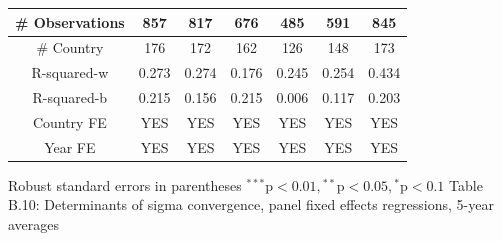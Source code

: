 \documentclass[10pt]{article}
\begin{document}
\begin{center}
\begin{tabular}{|c|c|c|c|c|c|c|}
\hline
\# Observations & 857 & 817 & 676 & 485 & 591 & 845 \\
\hline
\# Country & 176 & 172 & 162 & 126 & 148 & 173 \\
\hline
R-squared-w & 0.273 & 0.274 & 0.176 & 0.245 & 0.254 & 0.434 \\
\hline
R-squared-b & 0.215 & 0.156 & 0.215 & 0.006 & 0.117 & 0.203 \\
\hline
Country FE & YES & YES & YES & YES & YES & YES \\
\hline
Year FE & YES & YES & YES & YES & YES & YES \\
\hline
\end{tabular}
\end{center}

Robust standard errors in parentheses ${ }^{* * *} \mathrm{p}<0.01,{ }^{* *} \mathrm{p}<0.05,{ }^{*} \mathrm{p}<0.1$ Table B.10: Determinants of sigma convergence, panel fixed effects regressions, 5-year averages
\end{document}
